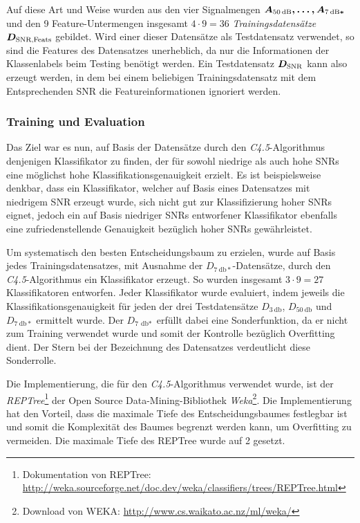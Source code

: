 Auf diese Art und Weise wurden aus den vier Signalmengen $\boldmath{A_{\SI{50}{\decibel}}}, \ldots , \boldmath{A_{\SI{7}{\decibel}*}}$ und den 9 Feature-Untermengen insgesamt $4 \cdot 9 = 36$ \emph{Trainingsdatensätze} $\boldmath{D_{\text{SNR,Feats}}}$ gebildet. Wird einer dieser Datensätze als Testdatensatz verwendet, so sind die Features des Datensatzes unerheblich, da nur die Informationen der Klassenlabels beim Testing benötigt werden. Ein Testdatensatz $\boldmath{D_{\text{SNR}}}$ kann also erzeugt werden, in dem bei einem beliebigen Trainingsdatensatz mit dem Entsprechenden SNR die Featureinformationen ignoriert werden.

\subsubsection{Training und Evaluation}
\label{sec:vad_training}

Das Ziel war es nun, auf Basis der Datensätze durch den \emph{C4.5}-Algorithmus denjenigen Klassifikator zu finden, der für sowohl niedrige als auch hohe SNRs eine möglichst hohe Klassifikationsgenauigkeit erzielt. Es ist beispielsweise denkbar, dass ein Klassifikator, welcher auf Basis eines Datensatzes mit niedrigem SNR erzeugt wurde, sich nicht gut zur Klassifizierung hoher SNRs eignet, jedoch ein auf Basis niedriger SNRs entworfener Klassifikator ebenfalls eine zufriedenstellende Genauigkeit bezüglich hoher SNRs gewährleistet.

Um systematisch den besten Entscheidungsbaum zu erzielen, wurde auf Basis jedes Trainingsdatensatzes, mit Ausnahme der $D_{\SI{7}{\decibel}*}$-Datensätze, durch den \emph{C4.5}-Algorithmus ein Klassifikator erzeugt. So wurden insgesamt $3 \cdot 9 = 27$ Klassifikatoren entworfen. Jeder Klassifikator wurde evaluiert, indem jeweils die Klassifikationsgenauigkeit für jeden der drei Testdatensätze $D_{\SI{3}{\decibel}}$, $D_{\SI{50}{\decibel}}$ und $D_{\SI{7}{\decibel}*}$ ermittelt wurde. Der $D_{\SI{7}{\decibel*}}$ erfüllt dabei eine Sonderfunktion, da er nicht zum Training verwendet wurde und somit der Kontrolle bezüglich Overfitting dient. Der Stern bei der Bezeichnung des Datensatzes verdeutlicht diese Sonderrolle.

Die Implementierung, die für den \emph{C4.5}-Algorithmus verwendet wurde, ist der \emph{REPTree}\footnote{Dokumentation von REPTree: \url{http://weka.sourceforge.net/doc.dev/weka/classifiers/trees/REPTree.html}} der Open Source Data-Mining-Bibliothek \emph{Weka}\footnote{Download von WEKA: \url{http://www.cs.waikato.ac.nz/ml/weka/}}. Die Implementierung hat den Vorteil, dass die maximale Tiefe des Entscheidungsbaumes festlegbar ist und somit die Komplexität des Baumes begrenzt werden kann, um Overfitting zu vermeiden. Die maximale Tiefe des REPTree wurde auf 2 gesetzt. 

